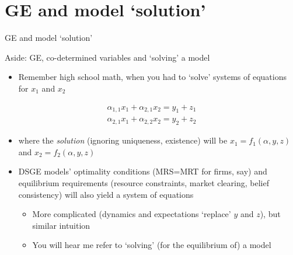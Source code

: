 \section{GE and model `solution'}

\begin{frame}

\begin{center}
{\LARGE GE and model `solution'}
\end{center}

\end{frame}


\begin{frame}{Aside: GE, co-determined variables and `solving' a model}

\begin{itemize}
\item	Remember high school math, when you had to `solve' systems of equations for $x_{1}$ and $x_{2}$
\end{itemize}
\begin{eqnarray*}
\alpha_{1,1}x_{1} + \alpha_{2,1}x_{2}	= y_{1} + z_{1}	\\
\alpha_{2,1}x_{1} + \alpha_{2,2}x_{2}	= y_{2} + z_{2}
\end{eqnarray*}

\begin{itemize}
\item[]	where the \textit{solution} (ignoring uniqueness, existence) will be $x_{1}=f_{1}(\alpha,y,z)$ and $x_{2}=f_{2}(\alpha,y,z)$
\end{itemize}
\begin{itemize}
\item	DSGE models' optimality conditions (MRS=MRT for firms, say) and equilibrium requirements (resource constraints, market clearing, belief consistency) will also yield a system of equations
	\begin{itemize}
	\item	More complicated (dynamics and expectations `replace' $y$ and $z$), but similar intuition
	\item	You will hear me refer to `solving' (for the equilibrium of) a model
	\end{itemize}
\end{itemize}

\end{frame}

